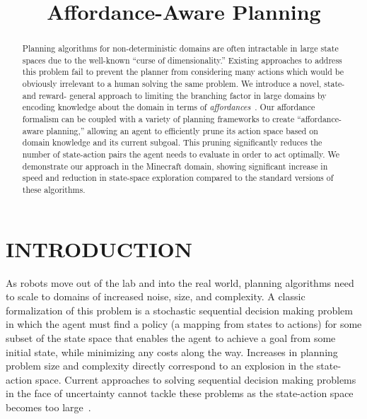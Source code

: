 \documentclass[]{article}
\title{Affordance-Aware Planning}
\newcommand{\stnote}[1]{\textcolor{Blue}{\textbf{ST: #1}}}
\begin{document}
\author{}
\maketitle

\begin{abstract}

Planning algorithms for non-deterministic domains are often
intractable in large state spaces due to the well-known ``curse of
dimensionality.'' Existing approaches to address this problem fail to
prevent the planner from considering many actions which would be
obviously irrelevant to a human solving the same problem. We
introduce a novel, state- and reward- general approach to limiting the
branching factor in large domains by encoding knowledge about the
domain in terms of {\em affordances}~\citep{gibson77}.  Our affordance
formalism can be coupled with a variety of planning frameworks to
create ``affordance-aware planning,'' allowing an agent to efficiently
prune its action space based on domain knowledge and its current
subgoal.  This pruning significantly reduces the number of
state-action pairs the agent needs to evaluate in order to act
optimally. We demonstrate our approach in the Minecraft domain,
showing significant increase in speed and reduction in state-space
exploration compared to the standard versions of these algorithms.

\end{abstract}


\section{INTRODUCTION}

As robots move out of the lab and into the real world, planning
algorithms need to scale to domains of increased noise, size, and
complexity.  A classic formalization of this problem is a stochastic
sequential decision making problem in which the agent must find a
policy (a mapping from states to actions) for some subset of the state
space that enables the agent to achieve a goal from some initial
state, while minimizing any costs along the way.
Increases in planning problem size
and complexity directly correspond to an explosion in the state-action
space. Current approaches to solving sequential decision making
problems in the face of uncertainty cannot tackle these problems 
as the state-action space becomes too large~\citep{grounds05}.
\end{document}
